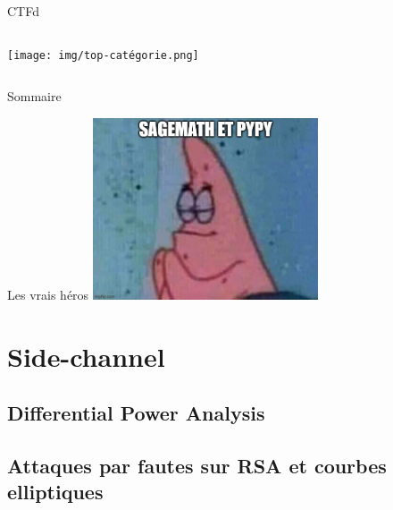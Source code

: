 \documentclass[aspectratio=169,xcolor=dvipsnames]{beamer}
\begin{document}
\begin{frame}{CTFd}
{\begin{columns}[c]
            \begin{center}                  
                \texttt{[image: img/top-catégorie.png]}
            \end{center}
    \end{columns}
    }   
\end{frame}

\begin{frame}{Sommaire}
    \tableofcontents
\end{frame}


\begin{frame}{Les vrais héros}
\centering
\includegraphics[width=0.5\textwidth]{img/meme/thanks.png}
\end{frame}


\section{Side-channel}
\subsection{Differential Power Analysis}

\subsection{Attaques par fautes sur RSA et courbes elliptiques}

\end{document}
